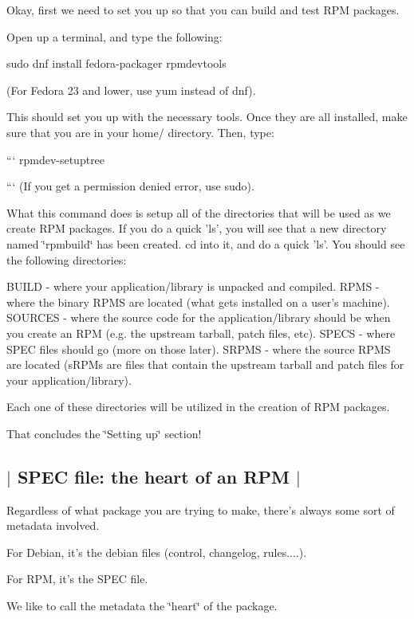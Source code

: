 Okay, first we need to set you up so that you can build and test R\-P\-M packages.

Open up a terminal, and type the following\-:

sudo dnf install fedora-\/packager rpmdevtools

(For Fedora 23 and lower, use yum instead of dnf).

This should set you up with the necessary tools. Once they are all installed, make sure that you are in your home/ directory. Then, type\-:

``` rpmdev-\/setuptree

``` (If you get a permission denied error, use sudo).

What this command does is setup all of the directories that will be used as we create R\-P\-M packages. If you do a quick 'ls', you will see that a new directory named \char`\"{}rpmbuild\char`\"{} has been created. cd into it, and do a quick 'ls'. You should see the following directories\-:

B\-U\-I\-L\-D -\/ where your application/library is unpacked and compiled. R\-P\-M\-S -\/ where the binary R\-P\-M\-S are located (what gets installed on a user's machine). S\-O\-U\-R\-C\-E\-S -\/ where the source code for the application/library should be when you create an R\-P\-M (e.\-g. the upstream tarball, patch files, etc). S\-P\-E\-C\-S -\/ where S\-P\-E\-C files should go (more on those later). S\-R\-P\-M\-S -\/ where the source R\-P\-M\-S are located (s\-R\-P\-Ms are files that contain the upstream tarball and patch files for your application/library).

Each one of these directories will be utilized in the creation of R\-P\-M packages.

That concludes the \char`\"{}\-Setting up\char`\"{} section! 

 \subsection*{$\vert$ S\-P\-E\-C file\-: the heart of an R\-P\-M $\vert$ }

Regardless of what package you are trying to make, there's always some sort of metadata involved.

For Debian, it's the debian files (control, changelog, rules....).

For R\-P\-M, it's the S\-P\-E\-C file.

We like to call the metadata the \char`\"{}heart\char`\"{} of the package.


